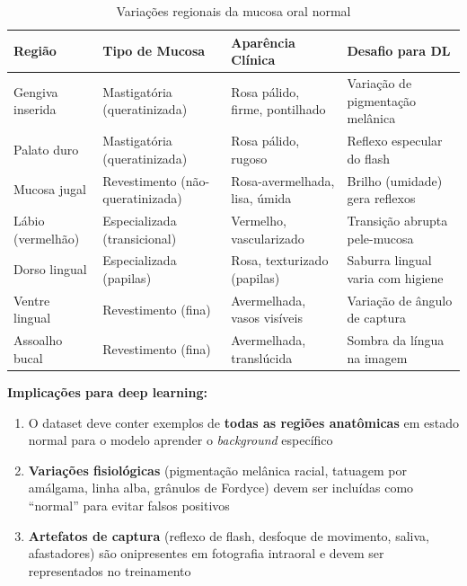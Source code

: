 \begin{table}[H]
  \centering
  \caption{Variações regionais da mucosa oral normal}
  \label{tab:mucosa-normal}
  \begin{tabularx}{\textwidth}{lllX}
    \toprule
    \textbf{Região} & \textbf{Tipo de Mucosa} & \textbf{Aparência Clínica} & \textbf{Desafio para DL} \\
    \midrule
    Gengiva inserida & Mastigatória (queratinizada) & Rosa pálido, firme, pontilhado & Variação de pigmentação melânica \\
    Palato duro & Mastigatória (queratinizada) & Rosa pálido, rugoso & Reflexo especular do flash \\
    Mucosa jugal & Revestimento (não-queratinizada) & Rosa-avermelhada, lisa, úmida & Brilho (umidade) gera reflexos \\
    Lábio (vermelhão) & Especializada (transicional) & Vermelho, vascularizado & Transição abrupta pele-mucosa \\
    Dorso lingual & Especializada (papilas) & Rosa, texturizado (papilas) & Saburra lingual varia com higiene \\
    Ventre lingual & Revestimento (fina) & Avermelhada, vasos visíveis & Variação de ângulo de captura \\
    Assoalho bucal & Revestimento (fina) & Avermelhada, translúcida & Sombra da língua na imagem \\
    \bottomrule
  \end{tabularx}
\end{table}

\textbf{Implicações para deep learning:}
\begin{enumerate}
  \item O dataset deve conter exemplos de \textbf{todas as regiões anatômicas}
        em estado normal para o modelo aprender o \textit{background} específico
  \item \textbf{Variações fisiológicas} (pigmentação melânica racial, tatuagem
        por amálgama, linha alba, grânulos de Fordyce) devem ser incluídas como
        ``normal'' para evitar falsos positivos
  \item \textbf{Artefatos de captura} (reflexo de flash, desfoque de movimento,
        saliva, afastadores) são onipresentes em fotografia intraoral e devem
        ser representados no treinamento
\end{enumerate}


